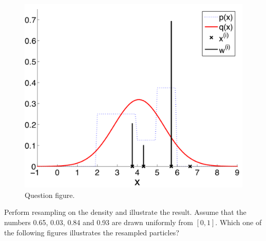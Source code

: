 \begin{enumerate}
\begin{figure}[!htb]
\begin{center}
\includegraphics[scale=0.280]{img/particle_filters/P0_7_3_4_ex1.png}
\end{center}
\caption{Question figure.}
\label{P0_7_3_4_ex1}
\end{figure}
Perform resampling on the density and illustrate the result. Assume that the numbers 0.65, 0.03, 0.84 and 0.93 are drawn uniformly from $[0,1]$.
Which one of the following figures illustrates the resampled particles?


\end{enumerate}

